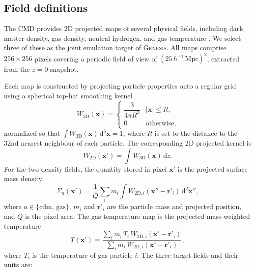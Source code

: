 \documentclass[usenatbib]{mnras}
\begin{document}
\subsection{Field definitions}
\label{sec:fields}

The CMD provides 2D projected maps of several physical fields, including
dark matter density, gas density, neutral hydrogen, and gas temperature
\citep{Villaescusa2022}. We select three of these as the joint
emulation target of \textsc{Genesis}. All maps comprise
$256 \times 256$ pixels covering a periodic field of view of
$(25\,h^{-1}\,\mathrm{Mpc})^2$, extracted from the $z=0$ snapshot.

Each map is constructed by projecting particle properties onto a regular
grid using a spherical top-hat smoothing kernel \citep{Villaescusa2022}
\begin{equation}
  W_{3\mathrm{D}}(\mathbf{x}) =
  \begin{cases}
    \dfrac{3}{4\pi R^3} & |\mathbf{x}| \leq R, \\[4pt]
    0                   & \text{otherwise},
  \end{cases}
  \label{eq:kernel3d}
\end{equation}
normalized so that $\int W_{3\mathrm{D}}(\mathbf{x})\,\mathrm{d}^3\mathbf{x} = 1$,
where $R$ is set to the distance to the 32nd nearest neighbour of each
particle. The corresponding 2D projected kernel is
\begin{equation}
  W_{2\mathrm{D}}(\mathbf{x}') =
  \int W_{3\mathrm{D}}(\mathbf{x})\,\mathrm{d}z.
  \label{eq:kernel2d}
\end{equation}
For the two density fields, the quantity stored in pixel $\mathbf{x}'$
is the projected surface mass density
\begin{equation}
  \Sigma_a(\mathbf{x}') = \frac{1}{Q}
  \sum_i m_i
  \int W_{2\mathrm{D},i}(\mathbf{x}'' - \mathbf{r}'_i)\,\mathrm{d}^2\mathbf{x}'',
  \label{eq:density}
\end{equation}
where $a \in \{\mathrm{cdm},\,\mathrm{gas}\}$, $m_i$ and $\mathbf{r}'_i$
are the particle mass and projected position, and $Q$ is the pixel area.
The gas temperature map is the projected mass-weighted temperature
\begin{equation}
  T(\mathbf{x}') =
  \frac{\sum_i m_i\,T_i\,W_{2\mathrm{D},i}(\mathbf{x}' - \mathbf{r}'_i)}
       {\sum_i m_i\,W_{2\mathrm{D},i}(\mathbf{x}' - \mathbf{r}'_i)},
  \label{eq:temperature}
\end{equation}
where $T_i$ is the temperature of gas particle $i$.
The three target fields and their units are:
\end{document}
